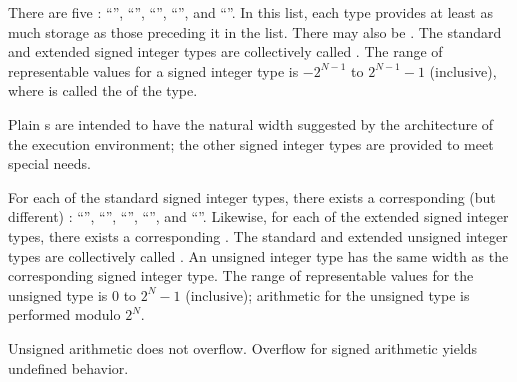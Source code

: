 \pnum
{}%
There are five :
%
%
%
%
%
``'', ``'', ``'',
``'', and ``''. In
this list, each type provides at least as much storage as those
preceding it in the list.
There may also be 
.
The standard and extended signed integer types are collectively called
.
The range of representable values for a signed integer type is
$-2^{N-1}$ to $2^{N-1}-1$ (inclusive),
where  is called the  of the type.
%
\begin{note}
Plain s are intended to have
the natural width suggested by the architecture of the execution environment;
the other signed integer types are provided to meet special needs.
\end{note}

\pnum
{}%
For each of the standard signed integer types,
there exists a corresponding (but different)
:
%
%
%
%
%
``'', ``'',
``'', ``'', and
``''.
Likewise, for each of the extended signed integer types,
there exists a corresponding .
The standard and extended unsigned integer types
are collectively called .
An unsigned integer type has the same width 
as the corresponding signed integer type.
%
The range of representable values for the unsigned type is
$0$ to $2^N-1$ (inclusive);
arithmetic for the unsigned type is performed modulo $2^N$.
\begin{note}
Unsigned arithmetic does not overflow.
Overflow for signed arithmetic yields undefined behavior.
\end{note}


